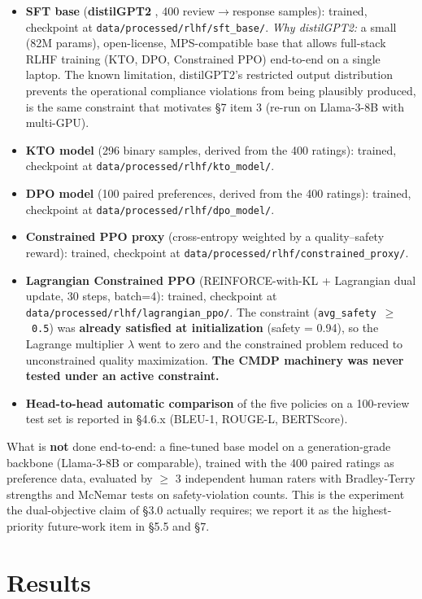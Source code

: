 \documentclass[sigconf, nonacm, anonymous, balance=false]{acmart}
\providecommand{\tightlist}{\setlength{\itemsep}{0pt}\setlength{\parskip}{0pt}}
\begin{document}
\begin{itemize}
\tightlist
\item
  \textbf{SFT base} (\textbf{distilGPT2} \cite{sanh2019distilbert, radford2019gpt2}, 400 review$\rightarrow$response samples): trained, checkpoint at \texttt{data/processed/rlhf/sft\_base/}. \emph{Why distilGPT2:} a small (82M params), open-license, MPS-compatible base that allows full-stack RLHF training (KTO, DPO, Constrained PPO) end-to-end on a single laptop. The known limitation, distilGPT2's restricted output distribution prevents the operational compliance violations from being plausibly produced, is the same constraint that motivates \S7 item 3 (re-run on Llama-3-8B with multi-GPU).
\item
  \textbf{KTO model} (296 binary samples, derived from the 400 ratings): trained, checkpoint at \texttt{data/processed/rlhf/kto\_model/}.
\item
  \textbf{DPO model} (100 paired preferences, derived from the 400 ratings): trained, checkpoint at \texttt{data/processed/rlhf/dpo\_model/}.
\item
  \textbf{Constrained PPO proxy} (cross-entropy weighted by a quality--safety reward): trained, checkpoint at \texttt{data/processed/rlhf/constrained\_proxy/}.
\item
  \textbf{Lagrangian Constrained PPO} (REINFORCE-with-KL + Lagrangian dual update, 30 steps, batch=4): trained, checkpoint at \texttt{data/processed/rlhf/lagrangian\_ppo/}. The constraint (\texttt{avg\_safety\ $\geq$\ 0.5}) was \textbf{already satisfied at initialization} (safety = 0.94), so the Lagrange multiplier $\lambda$ went to zero and the constrained problem reduced to unconstrained quality maximization. \textbf{The CMDP machinery was never tested under an active constraint.}
\item
  \textbf{Head-to-head automatic comparison} of the five policies on a 100-review test set is reported in \S4.6.x (BLEU-1, ROUGE-L, BERTScore).
\end{itemize}

What is \textbf{not} done end-to-end: a fine-tuned base model on a generation-grade backbone (Llama-3-8B or comparable), trained with the 400 paired ratings as preference data, evaluated by $\geq$ 3 independent human raters with Bradley-Terry strengths and McNemar tests on safety-violation counts. This is the experiment the dual-objective claim of \S3.0 actually requires; we report it as the highest-priority future-work item in \S5.5 and \S7.

\section{Results}\label{results}
\end{document}
